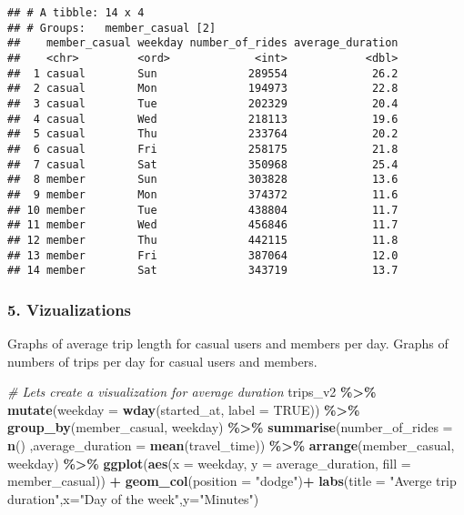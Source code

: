 \documentclass[
]{article}
\newenvironment{Shaded}{\begin{snugshade}}{\end{snugshade}}
\newcommand{\AttributeTok}[1]{\textcolor[rgb]{0.13,0.29,0.53}{#1}}
\newcommand{\CommentTok}[1]{\textcolor[rgb]{0.56,0.35,0.01}{\textit{#1}}}
\newcommand{\ConstantTok}[1]{\textcolor[rgb]{0.56,0.35,0.01}{#1}}
\newcommand{\FunctionTok}[1]{\textcolor[rgb]{0.13,0.29,0.53}{\textbf{#1}}}
\newcommand{\NormalTok}[1]{#1}
\newcommand{\SpecialCharTok}[1]{\textcolor[rgb]{0.81,0.36,0.00}{\textbf{#1}}}
\newcommand{\StringTok}[1]{\textcolor[rgb]{0.31,0.60,0.02}{#1}}
\begin{document}
\begin{verbatim}
## # A tibble: 14 x 4
## # Groups:   member_casual [2]
##    member_casual weekday number_of_rides average_duration
##    <chr>         <ord>             <int>            <dbl>
##  1 casual        Sun              289554             26.2
##  2 casual        Mon              194973             22.8
##  3 casual        Tue              202329             20.4
##  4 casual        Wed              218113             19.6
##  5 casual        Thu              233764             20.2
##  6 casual        Fri              258175             21.8
##  7 casual        Sat              350968             25.4
##  8 member        Sun              303828             13.6
##  9 member        Mon              374372             11.6
## 10 member        Tue              438804             11.7
## 11 member        Wed              456846             11.7
## 12 member        Thu              442115             11.8
## 13 member        Fri              387064             12.0
## 14 member        Sat              343719             13.7
\end{verbatim}

\hypertarget{vizualizations}{%
\subsubsection{5. Vizualizations}\label{vizualizations}}

Graphs of average trip length for casual users and members per day.
Graphs of numbers of trips per day for casual users and members.

\begin{Shaded}
\begin{Highlighting}[]
\CommentTok{\# Let\textquotesingle{}s create a visualization for average duration}
\NormalTok{trips\_v2 }\SpecialCharTok{\%\textgreater{}\%} 
  \FunctionTok{mutate}\NormalTok{(}\AttributeTok{weekday =} \FunctionTok{wday}\NormalTok{(started\_at, }\AttributeTok{label =} \ConstantTok{TRUE}\NormalTok{)) }\SpecialCharTok{\%\textgreater{}\%} 
  \FunctionTok{group\_by}\NormalTok{(member\_casual, weekday) }\SpecialCharTok{\%\textgreater{}\%} 
  \FunctionTok{summarise}\NormalTok{(}\AttributeTok{number\_of\_rides =} \FunctionTok{n}\NormalTok{()}
\NormalTok{            ,}\AttributeTok{average\_duration =} \FunctionTok{mean}\NormalTok{(travel\_time)) }\SpecialCharTok{\%\textgreater{}\%} 
  \FunctionTok{arrange}\NormalTok{(member\_casual, weekday)  }\SpecialCharTok{\%\textgreater{}\%} 
  \FunctionTok{ggplot}\NormalTok{(}\FunctionTok{aes}\NormalTok{(}\AttributeTok{x =}\NormalTok{ weekday, }\AttributeTok{y =}\NormalTok{ average\_duration, }\AttributeTok{fill =}\NormalTok{ member\_casual)) }\SpecialCharTok{+}
  \FunctionTok{geom\_col}\NormalTok{(}\AttributeTok{position =} \StringTok{"dodge"}\NormalTok{)}\SpecialCharTok{+} 
  \FunctionTok{labs}\NormalTok{(}\AttributeTok{title =} \StringTok{"Averge trip duration"}\NormalTok{,}\AttributeTok{x=}\StringTok{"Day of the week"}\NormalTok{,}\AttributeTok{y=}\StringTok{"Minutes"}\NormalTok{)}
\end{Highlighting}
\end{Shaded}
\end{document}
